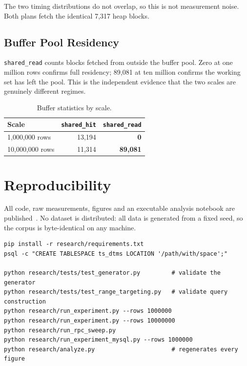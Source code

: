 \documentclass[12pt, a4paper]{article}
\begin{document}
The two timing distributions do not overlap, so this is not measurement
noise. Both plans fetch the identical 7{,}317 heap blocks.

\subsection{Buffer Pool Residency}

\texttt{shared\_read} counts blocks fetched from outside the buffer
pool. Zero at one million rows confirms full residency; 89{,}081 at ten
million confirms the working set has left the pool. This is the
independent evidence that the two scales are genuinely different
regimes.

\begin{table}[htbp]
\centering
\caption{Buffer statistics by scale.}
\label{tab:buffers}
\small
\begin{tabular}{@{}lrr@{}}
\toprule
\textbf{Scale} & \texttt{shared\_hit} & \texttt{shared\_read} \\
\midrule
1{,}000{,}000 rows & 13{,}194 & \textbf{0} \\
10{,}000{,}000 rows & 11{,}314 & \textbf{89{,}081} \\
\bottomrule
\end{tabular}
\end{table}

\section{Reproducibility}

All code, raw measurements, figures and an executable analysis notebook
are published~\cite{artifact2026}. No dataset is distributed: all data
is generated from a fixed seed, so the corpus is byte-identical on any
machine.

\begin{lstlisting}[caption={Complete reproduction sequence.}]
pip install -r research/requirements.txt
psql -c "CREATE TABLESPACE ts_dtms LOCATION '/path/with/space';"

python research/tests/test_generator.py         # validate the generator
python research/tests/test_range_targeting.py   # validate query construction
python research/run_experiment.py --rows 1000000
python research/run_experiment.py --rows 10000000
python research/run_rpc_sweep.py
python research/run_experiment_mysql.py --rows 1000000
python research/analyze.py                      # regenerates every figure
\end{lstlisting}
\end{document}
